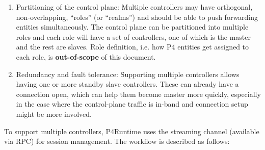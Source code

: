 \documentclass[11pt]{article}
\begin{document}
{%
\begin{enumerate}%

\item{}
Partitioning of the control plane: Multiple controllers may have orthogonal,
non-overlapping, \textquotedblleft{}roles\textquotedblright{} (or \textquotedblleft{}realms\textquotedblright{}) and should be able to push forwarding
entities simultaneously. The control plane can be partitioned into multiple
roles and each role will have a set of controllers, one of which is the
master and the rest are slaves. Role definition, i.e. how P4 entities get
assigned to each role, is \textbf{out-of-scope} of this document.%

\item{}
Redundancy and fault tolerance: Supporting multiple controllers allows having
one or more standby slave controllers. These can already have a connection
open, which can help them become master more quickly, especially in the case
where the control-plane traffic is in-band and connection setup might be more
involved.%
\end{enumerate}%

\noindent{}To support multiple controllers, P4Runtime uses the streaming channel (available
via  RPC) for session management. The workflow is described as
follows:%

\begin{itemize}%


\end{itemize}}
\end{document}
